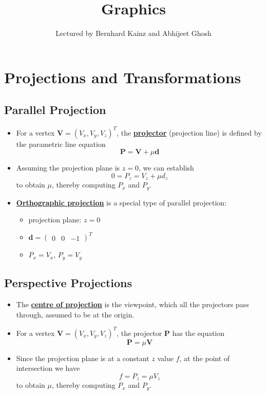 \documentclass[twocolumn,landscape,10pt]{article}
\author{Lectured by Bernhard Kainz and Abhijeet Ghosh}
\title{Graphics}
\affil{Typed by Aris Zhu Yi Qing}
\theoremstyle{definition}
\begin{document}
\maketitle
\tableofcontents

\newpage
\section{Projections and Transformations}

\subsection{Parallel Projection}

\begin{itemize}
    \item For a vertex $\mathbf{V} = (V_x,V_y, V_z)^T$, the
        \underline{\textbf{projector}}
        (projection line) is defined by the parametric line equation
        \[
            \mathbf{P}=\mathbf{V}+\mu \mathbf{d}
        \]
    \item Assuming the projection plane is $z=0$, we can establish
        \[
            0 = P_z = V_z + \mu d_z
        \]
        to obtain $\mu$, thereby computing $P_x$ and $P_y$.
    \item \underline{\textbf{Orthographic projection}} is a special type of
        parallel projection:
        \begin{itemize}
            \item projection plane: $z=0$
            \item $\mathbf{d}=\begin{pmatrix}
                    0 & 0 & -1
                \end{pmatrix}^T$
            \item  $P_x=V_x$, $P_y=V_y$
        \end{itemize} 
\end{itemize} 

\subsection{Perspective Projections}

\begin{itemize}
    \item The \underline{\textbf{centre of projection}} is the viewpoint, which
        all the projectors pass through, assumed to be at the origin.
    \item For a vertex $\mathbf{V} = (V_x,V_y, V_z)^T$, the projector
        $\mathbf{P}$ has the equation
        \[
            \mathbf{P}=\mu\mathbf{V}
        \]
    \item Since the projection plane is at a constant $z$ value $f$, at the
        point of intersection we have
        \[
            f = P_z = \mu V_z
        \]
        to obtain $\mu$, thereby computing $P_x$ and $P_y$.
\end{itemize} 
\end{document}
